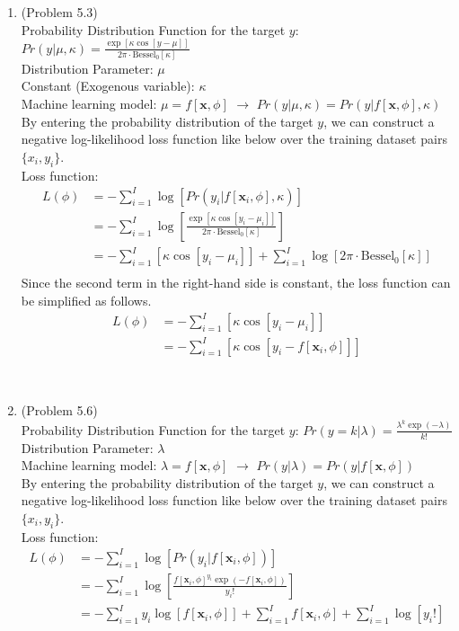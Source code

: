 \documentclass[10pt]{article}
\begin{document}
\begin{enumerate}
\item (Problem 5.3) \\
	Probability Distribution Function for the target $y$: $Pr(y|\mu, \kappa)=\frac{\exp[\kappa\cos[y-\mu]]}{2\pi\cdot \text{Bessel}_0[\kappa]}$ \\
	Distribution Parameter: $\mu$ \\
	Constant (Exogenous variable): $\kappa$ \\
	Machine learning model: $\mu=f[\textbf{x}, \phi]$ $\rightarrow$ $Pr(y|\mu, \kappa)=Pr(y|f[\textbf{x}, \phi], \kappa)$ \\
	By entering the probability distribution of the target $y$, we can construct a negative log-likelihood loss function like below over the training dataset pairs $\{x_i, y_i\}$. \\
	Loss function:
	\begin{align*}
	L(\phi) &= -\sum_{i=1}^I \log[Pr(y_i|f[\textbf{x}_i, \phi], \kappa)] \\
	&= -\sum_{i=1}^I \log[\frac{\exp[\kappa\cos[y_i-\mu_i]]}{2\pi\cdot \text{Bessel}_0[\kappa]}] \\
	&= -\sum_{i=1}^I [\kappa\cos[y_i-\mu_i]]+\sum_{i=1}^I \log[2\pi\cdot \text{Bessel}_0[\kappa]] \\
	\end{align*}
	Since the second term in the right-hand side is constant, the loss function can be simplified as follows.
	\begin{align*}
	L(\phi) &= -\sum_{i=1}^I [\kappa\cos[y_i-\mu_i]] \\
	&= -\sum_{i=1}^I [\kappa\cos[y_i-f[\textbf{x}_i, \phi]]]
	\end{align*}

\
	
\item (Problem 5.6) \\
	Probability Distribution Function for the target $y$: $Pr(y=k|\lambda)=\frac{\lambda^k \exp(-\lambda)}{k!}$ \\
	Distribution Parameter: $\lambda$ \\
	Machine learning model: $\lambda=f[\textbf{x}, \phi]$ $\rightarrow$ $Pr(y|\lambda)=Pr(y|f[\textbf{x}, \phi])$ \\
	By entering the probability distribution of the target $y$, we can construct a negative log-likelihood loss function like below over the training dataset pairs $\{x_i, y_i\}$. \\
	Loss function:
	\begin{align*}
	L(\phi) &= -\sum_{i=1}^I \log[Pr(y_i|f[\textbf{x}_i, \phi])] \\
	&= -\sum_{i=1}^I \log[\frac{f[\textbf{x}_i, \phi]^{y_i} \exp(-f[\textbf{x}_i, \phi])}{y_i!}] \\
	&= -\sum_{i=1}^I y_i \log[f[\textbf{x}_i, \phi]]+\sum_{i=1}^I f[\textbf{x}_i, \phi]+\sum_{i=1}^I \log[y_i!]
	\end{align*}


\end{enumerate}
\end{document}
